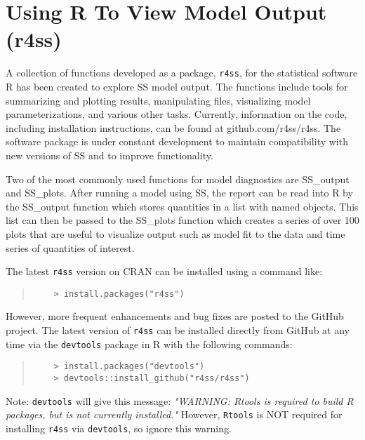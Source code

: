 
\section{Using R To View Model Output (r4ss)}\label{r4ss}

A collection of functions developed as a package, \texttt{r4ss}, for the statistical software R has been created to explore SS model output.  The functions include tools for summarizing and plotting results, manipulating files, visualizing model parameterizations, and various other tasks.  Currently, information on the code, including installation instructions, can be found at github.com/r4ss/r4ss.  The software package is under constant development to maintain compatibility with new versions of SS and to improve functionality.

Two of the most commonly used functions for model diagnostics are SS\_output and SS\_plots.  After running a model using SS, the report can be read into R by the SS\_output function which stores quantities in a list with named objects.  This list can then be passed to the SS\_plots function which creates a series of over 100 plots that are useful to visualize output such as model fit to the data and time series of quantities of interest.

The latest \texttt{r4ss} version on CRAN can be installed using a command like:

\begin{quote}
	\begin{verbatim}
	> install.packages("r4ss")
	\end{verbatim}
\end{quote}


However, more frequent enhancements and bug fixes are posted to the GitHub project.  The latest version of \texttt{r4ss} can be installed directly from GitHub at any time via the \texttt{devtools} package in R with the following commands:

\begin{quote}
	\begin{verbatim}
	> install.packages("devtools")
	> devtools::install_github("r4ss/r4ss")
	\end{verbatim}
\end{quote}

Note: \texttt{devtools} will give this message: \textit{"WARNING: Rtools is required to build R packages, but is not currently installed."} However, \texttt{Rtools} is NOT required for installing \texttt{r4ss} via \texttt{devtools}, so ignore this warning.

